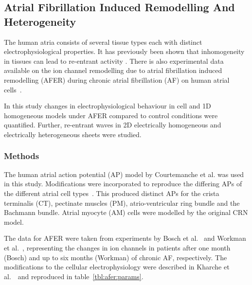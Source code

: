 \subsection{Atrial Fibrillation Induced Remodelling And Heterogeneity}

The human atria consists of several tissue types each with distinct
electrophysiological properties.  It has previously been shown that
inhomogeneity in tissues can lead to re-entrant activity
\cite{Bernus2005, Coronel1992, Kumagai1997}.  There is also experimental
data available on the ion channel remodelling due to atrial
fibrillation induced remodelling (AFER) during chronic atrial
fibrillation (AF) on human atrial cells~\cite{Bosch1999,Workman2001}.

In this study changes in electrophysiological
behaviour in cell and 1D homogeneous models under AFER compared to control
conditions were quantified.
Further, re-entrant waves in 2D electrically homogeneous
and electrically heterogeneous sheets were studied.

\subsubsection{Methods}

The human atrial action potential (AP) model by Courtemanche et
al.\cite{CRN98} was used in this study.  Modifications were
incorporated to reproduce the differing APs of the different atrial cell
types~\cite{Seemann2006}.  This produced distinct APs for the
crista terminalis (CT), pectinate muscles (PM), atrio-ventricular ring
bundle and the Bachmann bundle.  Atrial myocyte (AM) cells were modelled
by the original CRN model.

The data for AFER were taken from experiments by Bosch et
al.~\cite{Bosch1999} and Workman et al.~\cite{Workman2001}, representing
the changes in ion channels in patients after one month (Bosch)
and up to six months (Workman) of chronic AF, respectively.  The
modifications to the cellular electrophysiology were described in
Kharche et al.~\cite{Kharche2007}\ and reproduced in table~\ref{tbl:afer:params}.


